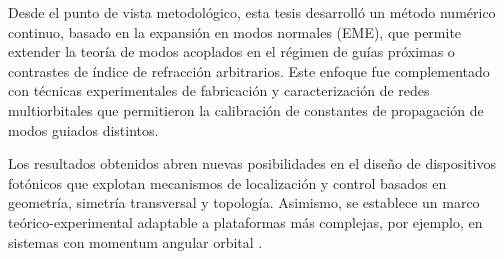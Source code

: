 Desde el punto de vista metodológico, esta tesis desarrolló un método numérico continuo, basado en la expansión en modos normales (EME), que permite extender la teoría de modos acoplados en el régimen de guías próximas o contrastes de índice de refracción arbitrarios. Este enfoque fue complementado con técnicas experimentales de fabricación y caracterización de redes multiorbitales que permitieron la calibración de constantes de propagación de modos guiados distintos.

Los resultados obtenidos abren nuevas posibilidades en el diseño de dispositivos fotónicos que explotan mecanismos de localización y control basados en geometría, simetría transversal y topología. Asimismo, se establece un marco teórico-experimental adaptable a plataformas más complejas, por ejemplo, en sistemas con momentum angular orbital \citep{OAMCaging}.

